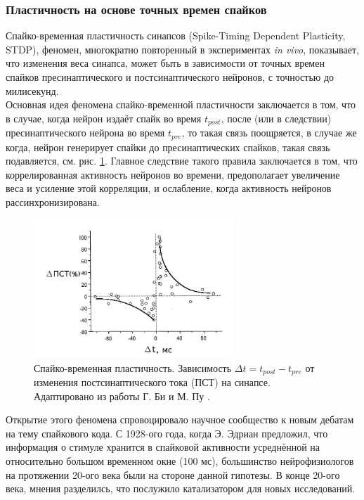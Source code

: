 \documentclass[a4paper,10pt]{article}
\begin{document}
\subsubsection{Пластичность на основе точных времен спайков}
\indent Спайко-временная пластичность синапсов (Spike-Timing Dependent Plasticity, STDP), феномен, многократно повторенный в экспериментах \textit{in vivo}, показывает, что изменения веса синапса, может быть в зависимости от точных времен спайков пресинаптического и постсинаптического нейронов, с точностью до милисекунд.\\
\indent Основная идея феномена спайко-временной пластичности заключается в том, что в случае, когда нейрон издаёт спайк во время $t_{post}$, после (или в следствии) пресинаптического нейрона во время $t_{pre}$, то такая связь поощряется, в случае же когда, нейрон генерирует спайки до пресинаптических спайков, такая связь подавляется, см. рис. \ref{stdp_pic}. Главное следствие такого правила заключается в том, что коррелированная активность нейронов во времени, предополагает увеличение веса и усиление этой корреляции, и ослабление, когда активность нейронов рассинхронизирована.\\
\begin{figure}[ht]
\centering
\captionsetup{justification=centering,margin=1cm}
\includegraphics[width=75mm,scale=0.7]{stdp.jpg}
\caption{Спайко-временная пластичность. Зависимость $\Delta t = t_{post} - t_{pre}$ от изменения постсинаптического тока (ПСТ) на синапсе. Адаптировано из работы Г. Би и М. Пу \cite{stdp4}. }
\label{stdp_pic}
\end{figure}
\FloatBarrier
\indent Открытие этого феномена спровоцировало научное сообщество к новым дебатам на тему спайкового кода. С 1928-ого года, когда Э. Эдриан\cite{rate_first} предложил, что информация о стимуле хранится в спайковой активности усреднённой на относительно большом временном окне (100 мс), большинство нейрофизиологов на протяжении 20-ого века были на стороне данной гипотезы. В конце 20-ого века, мнения разделилсь, что послужило катализатором для новых исследований.\\
\end{document}
